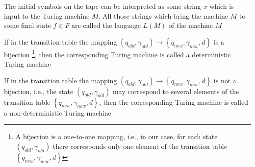 \begin{definition}
The initial symbols on the tape can be interpreted as some string $x$
which is input to the Turing machine $M$. All those strings which
bring the machine $M$ to some final state $f \in F$
are called the language $L\left(M\right)$ of the machine $M$
\end{definition}

\begin{definition}
If in the transition table the mapping
\(
\left(q_{old}, \gamma_{old}\right) \rightarrow 
\left\{q_{new}, \gamma_{new}, d\right\}
\)
is a bijection
\footnote{A bijection is a one-to-one mapping, i.e., in our
  case, for each state $\left(q_{old}, \gamma_{old}\right)$
  there corresponds only one element of the transition table 
  $\left\{q_{new}, \gamma_{new}, d\right\}$
},
then the corresponding Turing machine
is called a deterministic Turing machine
\label{defAlgoDMT}
\end{definition}

\begin{definition}
If in the transition table the mapping
\(
\left(q_{old}, \gamma_{old}\right) \rightarrow 
\left\{q_{new}, \gamma_{new}, d\right\}
\)
is not a bijection, i.e., the state $\left(q_{old}, \gamma_{old}\right)$
may correspond to several elements of the transition table 
$\left\{q_{new}, \gamma_{new}, d\right\}$,
then the corresponding Turing machine
is called a non-deterministic Turing machine
\label{defAlgoNDMT}
\end{definition}